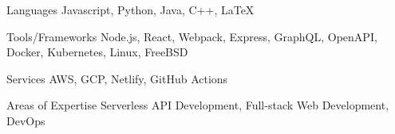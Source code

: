 

\begin{cvskills}
  

  \cvskill
    {Languages} %
    {Javascript, Python, Java, C++, LaTeX} %

  \cvskill
    {Tools/Frameworks} %
    {Node.js, React, Webpack, Express, GraphQL, OpenAPI, Docker, Kubernetes, Linux, FreeBSD} %

  \cvskill
    {Services} %
    {AWS, GCP, Netlify, GitHub Actions} %

  \cvskill
    {Areas of Expertise} %
    {Serverless API Development, Full-stack Web Development, DevOps} %








\end{cvskills}
